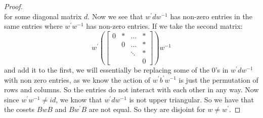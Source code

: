 \documentclass{article}
\begin{document}
\begin{itemize}
\begin{proof}
\begin{equation*}
                    \end{equation*}
                for some diagonal matrix $d$. Now we see that $w^{\prime}dw^{-1}$ has non-zero entries in the same entries where $w^{\prime}w^{-1}$ has non-zero entries. If we take the second matrix:
                    \begin{equation*}
                        w^{\prime}\left(\begin{bmatrix}
                            0 & * & \ldots  & * \\
                              & 0 & \ldots  & * \\
                              &   & \ddots  & * \\
                              &   &         & 0   
                        \end{bmatrix}\right)w^{-1}
                    \end{equation*}
                and add it to the first, we will essentially be replacing some of the $0$'s in $w^{\prime}dw^{-1}$ with non zero entries, as we know the action of $w^{\prime}b^{\prime}w^{-1}$ is just the permutation of rows and columns. So the entries do not interact with each other in any way. Now since $w^{\prime}w^{-1} \neq id$, we know that $w^{\prime}dw^{-1}$ is not upper triangular. So we have that the cosets $BwB$ and $Bw^{\prime}B$ are not equal. So they are disjoint for $w \neq w^{\prime}$.
            \end{proof}
    \end{itemize}
\end{document}
